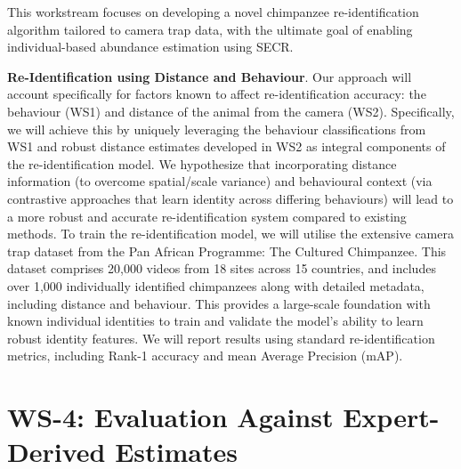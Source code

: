\documentclass{article}
\begin{document}
This workstream focuses on developing a novel chimpanzee re-identification algorithm tailored to camera trap data, with the ultimate goal of enabling individual-based abundance estimation using SECR.

\textbf{Re-Identiﬁcation using Distance and Behaviour}. Our approach will account specifically for factors known to affect re-identification accuracy: the behaviour (WS1) and distance of the animal from the camera (WS2). Specifically, we will achieve this by uniquely leveraging the behaviour classifications from WS1 and robust distance estimates developed in WS2 as integral components of the re-identification model. We hypothesize that incorporating distance information (to overcome spatial/scale variance) and behavioural context (via contrastive approaches that learn identity across differing behaviours) will lead to a more robust and accurate re-identification system compared to existing methods. %
To train the re-identification model, we will utilise the extensive camera trap dataset from the Pan African Programme: The Cultured Chimpanzee. This dataset comprises 20,000 videos from 18 sites across 15 countries, and includes over 1,000 individually identified chimpanzees along with detailed metadata, including distance and behaviour. This provides a large-scale foundation with known individual identities to train and validate the model’s ability to learn robust identity features. We will report results using standard re-identification metrics, including Rank-1 accuracy and mean Average Precision (mAP).


\section*{WS-4: Evaluation Against Expert-Derived Estimates}
\end{document}
